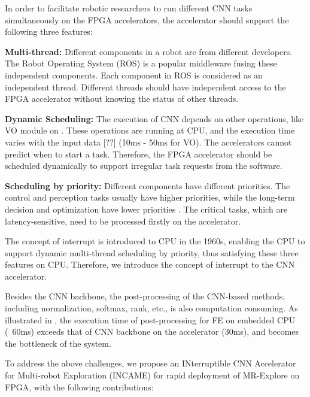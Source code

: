 In order to facilitate robotic researchers to run different CNN tasks simultaneously on the FPGA accelerators, the accelerator should support the following three features:

\textbf{Multi-thread:} Different components in a robot are from different developers. The Robot Operating System (ROS) \cite{quigley2009ros} is a popular middleware fusing these independent components. Each component in ROS is considered as an independent thread. Different threads should have independent access to the FPGA accelerator without knowing the status of other threads.



\textbf{Dynamic Scheduling:} The execution of CNN depends on other operations, like VO module on . 
These operations are running at CPU, and the execution time varies with the input data [??] (10ms - 50ms for VO). 
The accelerators cannot predict when to start a task. 
Therefore, the FPGA accelerator should be scheduled dynamically to support irregular task requests from the software.

\textbf{Scheduling by priority:} Different components have different priorities. The control and perception tasks usually have higher priorities, while the long-term decision and optimization have lower priorities \cite{RamsauerKLM17}. The critical tasks, which are latency-sensitive,  need to be processed firstly on the accelerator.

The concept of interrupt \cite{jen1974processor} is introduced to CPU in the 1960s, enabling the CPU to support dynamic multi-thread scheduling by priority, thus satisfying these three features on CPU. Therefore, we introduce the concept of interrupt to the CNN accelerator.

Besides the CNN backbone, the post-processing of the CNN-based methods, including normalization, softmax, rank, etc., is also computation consuming. As illustrated in , the execution time of post-processing for FE on embedded CPU (~60ms) exceeds that of CNN backbone on the accelerator (30ms), and becomes the bottleneck of the system.

To address the above challenges, we propose an INterruptible CNN Accelerator for Multi-robot Exploration (INCAME) for rapid deployment of MR-Explore on FPGA, with the following contributions:

